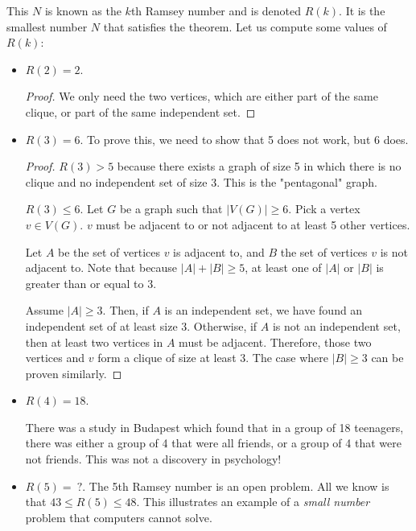 This \( N \) is known as the \( k \)th Ramsey number and is denoted \( R(k) \). It is the smallest number \( N \) that satisfies the theorem. Let us compute some values of \( R(k) \):
\begin{itemize}
	\item \( R(2)=2 \).
		\begin{proof}
			We only need the two vertices, which are either part of the same clique, or part of the same independent set.
		\end{proof}
	\item \( R(3)=6 \). To prove this, we need to show that 5 does not work, but 6 does.
		\begin{proof}
			\( R(3)>5 \) because there exists a graph of size 5 in which there is no clique and no independent set of size 3. This is the "pentagonal" graph. \par
			\( R(3) \le 6 \). Let \( G \) be a graph such that \( |V(G)| \ge 6 \). Pick a vertex \( v \in  V(G) \). \( v \) must be adjacent to or not adjacent to at least 5 other vertices. \par
			Let \( A \) be the set of vertices \( v \) is adjacent to, and \( B \) the set of vertices \( v \) is not adjacent to. Note that because \( |A| + |B| \ge 5 \), at least one of \( |A| \) or \( |B| \) is greater than or equal to 3. \par
			Assume \( |A| \ge 3 \). Then, if \( A \) is an independent set, we have found an independent set of at least size \( 3 \). Otherwise, if \( A \) is not an independent set, then at least two vertices in \( A \) must be adjacent. Therefore, those two vertices and \( v \) form a clique of size at least 3. The case where \( |B| \ge 3 \) can be proven similarly.
		\end{proof}
	\item \( R(4) = 18 \).
		\begin{note}
			There was a study in Budapest which found that in a group of 18 teenagers, there was either a group of 4 that were all friends, or a group of 4 that were not friends. This was not a discovery in psychology!
		\end{note}
	\item \( R(5) = ~? \). The 5th Ramsey number is an open problem. All we know is that \( 43 \le  R(5) \le 48 \). This illustrates an example of a \textit{small number} problem that computers cannot solve.
\end{itemize}

